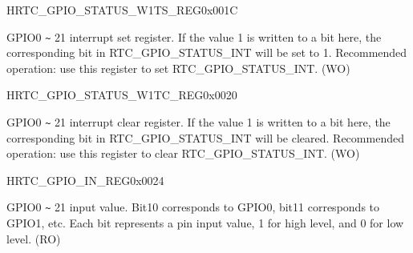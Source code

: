 \begin{register}{H}{RTC\_GPIO\_STATUS\_W1TS\_REG}{0x{}001C}\label{regdesc:RTCIORTCGPIOSTATUSW1TSREG}
%
%
\regnewline%
\begin{regdesc}\begin{reglist}
\label{fielddesc:RTCIOGPIOSTATUSINTW1TS}\item [RTC\_GPIO\_STATUS\_INT\_W1TS] GPIO0 \verb+~+ 21 interrupt set register. If the value 1 is written to a bit here, the corresponding bit in RTC\_GPIO\_STATUS\_INT will be set to 1. Recommended operation: use this register to set RTC\_GPIO\_STATUS\_INT. (WO)
\end{reglist}\end{regdesc}
\end{register}


\begin{register}{H}{RTC\_GPIO\_STATUS\_W1TC\_REG}{0x{}0020}\label{regdesc:RTCIORTCGPIOSTATUSW1TCREG}
%
%
\regnewline%
\begin{regdesc}\begin{reglist}
\label{fielddesc:RTCIOGPIOSTATUSINTW1TC}\item [RTC\_GPIO\_STATUS\_INT\_W1TC] GPIO0 \verb+~+ 21 interrupt clear register. If the value 1 is written to a bit here, the corresponding bit in RTC\_GPIO\_STATUS\_INT will be cleared. Recommended operation: use this register to clear RTC\_GPIO\_STATUS\_INT. (WO)
\end{reglist}\end{regdesc}
\end{register}


\begin{register}{H}{RTC\_GPIO\_IN\_REG}{0x{}0024}\label{regdesc:RTCIORTCGPIOINREG}
%
%
\regnewline%
\begin{regdesc}\begin{reglist}
\label{fielddesc:RTCIOGPIOINNEXT}\item [RTC\_GPIO\_IN\_NEXT] GPIO0 \verb+~+ 21 input value. Bit10 corresponds to GPIO0, bit11 corresponds to GPIO1, etc. Each bit represents a pin input value, 1 for high level, and 0 for low level. (RO)
\end{reglist}\end{regdesc}
\end{register}


